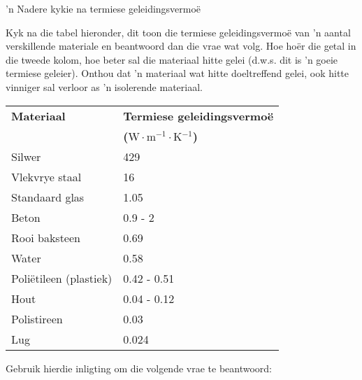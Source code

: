             \begin{Investigation}{ 'n Nadere kykie na termiese geleidingsvermo\"e}
{            \nopagebreak
      \label{m38706*id66744}      Kyk na die tabel hieronder, dit toon die termiese geleidingsvermo\"e van 'n aantal verskillende materiale en beantwoord dan die vrae wat volg. Hoe ho\"er die getal in die tweede kolom, hoe beter sal die materiaal hitte gelei (d.w.s. dit is 'n goeie termiese geleier). Onthou dat 'n materiaal wat hitte doeltreffend gelei, ook hitte vinniger sal verloor as 'n isolerende materiaal.\par 
          \begin{table}[H]
        \begin{center}
      \label{m38706*id66753}
    \noindent
      \begin{tabular}{|l|l|}\hline
\textbf{Materiaal} & \textbf{Termiese geleidingsvermoë} \\ 
                 &  \textbf{($\text{W}\ensuremath{\cdot}\text{m}{}^{-1}\ensuremath{\cdot}\text{K}{}^{-1}$) } \\ \hline
Silwer & 429 \\ \hline
Vlekvrye staal & 16 \\ \hline
Standaard glas & 1.05 \\ \hline
Beton & 0.9 - 2 \\ \hline
Rooi baksteen & 0.69 \\ \hline
Water & 0.58 \\ \hline
Poli\"etileen (plastiek) & 0.42 - 0.51 \\ \hline
Hout & 0.04 - 0.12 \\ \hline
Polistireen & 0.03 \\ \hline
Lug & 0.024 \\ \hline
    \end{tabular}
      \end{center}
\end{table}
    \par
      \label{m38706*id67009}Gebruik hierdie inligting om die volgende vrae te beantwoord:\par 
}
\end{Investigation}
